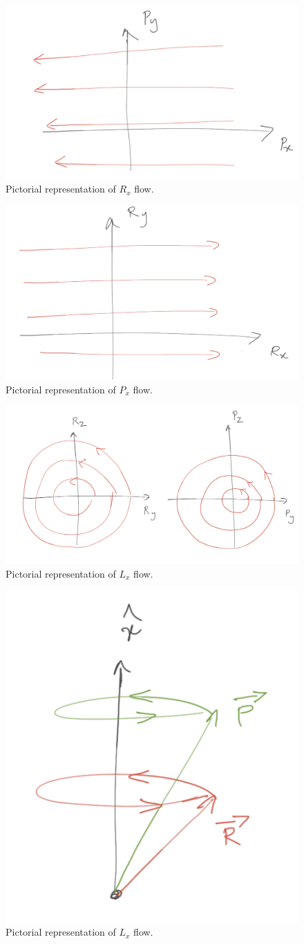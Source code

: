 \begin{figure}
  \centering
  \includegraphics[width=0.4\linewidth]{Rx_flow}
  \caption{Pictorial representation of $R_x$ flow.
    \vspace{-1.em}
  }
  \label{Rx_flow}
\end{figure}



\begin{figure}
    \centering
  \includegraphics[width=0.4\linewidth]{Px_flow}
  \caption{Pictorial representation of $P_x$ flow.
    \vspace{-1.em}
  }
  \label{Px_flow}
\end{figure}



\begin{figure}
    \centering
  \includegraphics[width=0.4\linewidth]{Lx_flow}
  \caption{Pictorial representation of $L_x$ flow.
    \vspace{-1.em}
  }
  \label{Lx_flow}
\end{figure}



\begin{figure}
   \centering
  \includegraphics[width=0.4\linewidth]{Lx_flow_2}
  \caption{Pictorial representation of $L_x$ flow.
    \vspace{-1.em}
  }
  \label{Lx_flow_2}
\end{figure}




